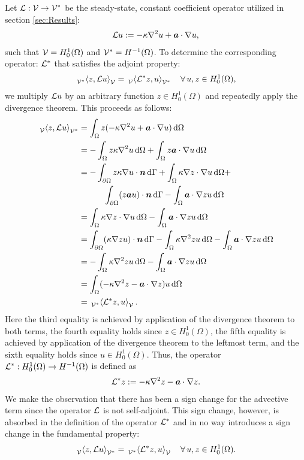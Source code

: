 Let $\mathcal{L}: \mathcal{V} \to \mathcal{V}^*$
be the steady-state, constant coefficient operator
utilized in section \ref{sec:Results}:
%
\begin{gather}
\mathcal{L} u := -\kappa \nabla^2 {u} + \boldsymbol{a} \cdot \nabla {u},
\end{gather}
such that $\mathcal{V} = H^1_0(\Omega)$ and $\mathcal{V}^* = H^{-1}(\Omega)$.
To determine the corresponding operator:
$\mathcal{L}^*$ that satisfies the adjoint property:
%
\begin{gather}
\,{}_{\mathcal{V}^*}^{}\!\left< {z}, {\mathcal{L} u} \right>_{\mathcal{V}} = \,{}_{\mathcal{V}}^{}\!\left< {\mathcal{L}^* z}, {u} \right>_{\mathcal{V}^*}
\quad \forall \, u, z \in H^1_0(\Omega),
\end{gather}
%
we multiply $\mathcal{L} u$ by an
arbitrary function $z \in H^1_0(\Omega)$ and
repeatedly apply the divergence theorem.
This proceeds as follows:
%
\begin{align*}
\,{}_{\mathcal{V}}^{}\!\left< {z}, {\mathcal{L} u} \right>_{\mathcal{V}^*}
&=
\int_{\Omega} z (-\kappa \nabla^2 {u} + \boldsymbol{a} \cdot \nabla {u}) \, \text{d} \Omega \\
&=
- \int_{\Omega} z \kappa \nabla^2 u \, \text{d} \Omega +
\int_{\Omega} z \boldsymbol{a} \cdot \nabla u \, \text{d} \Omega \\
&=
-\int_{\partial \Omega} z \kappa \nabla u \cdot \boldsymbol{n} \, \text{d} \Gamma +
\int_{\Omega} \kappa \nabla z \cdot \nabla u \, \text{d} \Omega + \\
& \quad \quad \quad \int_{\partial \Omega} (z \boldsymbol{a} u) \cdot \boldsymbol{n} \, \text{d} \Gamma -
\int_{\Omega} \boldsymbol{a} \cdot \nabla z u \, \text{d} \Omega \\
&=
\int_{\Omega} \kappa \nabla z \cdot \nabla u \, \text{d} \Omega -
\int_{\Omega} \boldsymbol{a} \cdot \nabla z u \, \text{d} \Omega \\
&=
\int_{\partial \Omega} (\kappa \nabla z u) \cdot \boldsymbol{n} \, \text{d} \Gamma -
\int_{\Omega} \kappa \nabla^2 z u \, \text{d} \Omega -
\int_{\Omega} \boldsymbol{a} \cdot \nabla z u \, \text{d} \Omega \\
&=
- \int_{\Omega} \kappa \nabla^2 z u \, \text{d} \Omega -
\int_{\Omega} \boldsymbol{a} \cdot \nabla z u \, \text{d} \Omega \\
&=
\int_{\Omega} (-\kappa \nabla^2 {z} - \boldsymbol{a} \cdot \nabla {z}) u \,
\text{d} \Omega \\
&=
\,{}_{\mathcal{V}^*}^{}\!\left< {\mathcal{L}^* z}, {u} \right>_{\mathcal{V}}.
\end{align*}
%
Here the third equality is achieved by application
of the divergence theorem to both terms,
the fourth equality holds since $z \in H^1_0(\Omega)$,
the fifth equality is achieved by application of the
divergence theorem to the leftmost term, and the sixth
equality holds since $u \in H^1_0(\Omega)$. Thus, the
operator $\mathcal{L}^* : H^1_0(\Omega) \to H^{-1}(\Omega)$ is defined as
%
\begin{gather}
\mathcal{L}^* z := -\kappa \nabla^2 {z} - \boldsymbol{a} \cdot \nabla {z}.
\end{gather}
%
We make the observation that there has been a sign
change for the advective term since the operator
$\mathcal{L}$ is not self-adjoint.
This sign change, however, is absorbed in the definition
of the operator $\mathcal{L}^*$ and in no way introduces
a sign change in the fundamental property:
%
\begin{gather}
\,{}_{\mathcal{V}}^{}\!\left< {z}, {\mathcal{L} u} \right>_{\mathcal{V}^*} = \,{}_{\mathcal{V}^*}^{}\!\left< {\mathcal{L}^* z}, {u} \right>_{\mathcal{V}} \quad \forall \, u, z \in H^1_0(\Omega).
\label{eq:adv_adjoint}
\end{gather}

